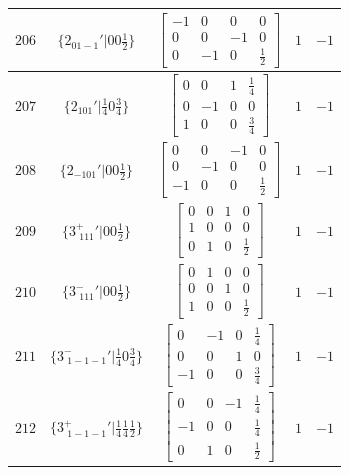 \documentclass[fleqn,8pt]{jsarticle}
\begin{document}
\begin{longtable}{ccccc}
$ 206 $ & $ \{2{}_{01-1}{}'|0 0 \frac{1}{2}\} $ & $ \begin{bmatrix} -1 & 0 & 0 & 0 \\ 0 & 0 & -1 & 0 \\ 0 & -1 & 0 & \frac{1}{2} \end{bmatrix} $ & $ 1 $ & $ -1 $ \\ \hline
$ 207 $ & $ \{2{}_{101}{}'|\frac{1}{4} 0 \frac{3}{4}\} $ & $ \begin{bmatrix} 0 & 0 & 1 & \frac{1}{4} \\ 0 & -1 & 0 & 0 \\ 1 & 0 & 0 & \frac{3}{4} \end{bmatrix} $ & $ 1 $ & $ -1 $ \\ \hline
$ 208 $ & $ \{2{}_{-101}{}'|0 0 \frac{1}{2}\} $ & $ \begin{bmatrix} 0 & 0 & -1 & 0 \\ 0 & -1 & 0 & 0 \\ -1 & 0 & 0 & \frac{1}{2} \end{bmatrix} $ & $ 1 $ & $ -1 $ \\ \hline
$ 209 $ & $ \{3^{+}_{\,\,111}{}'|0 0 \frac{1}{2}\} $ & $ \begin{bmatrix} 0 & 0 & 1 & 0 \\ 1 & 0 & 0 & 0 \\ 0 & 1 & 0 & \frac{1}{2} \end{bmatrix} $ & $ 1 $ & $ -1 $ \\ \hline
$ 210 $ & $ \{3^{-}_{\,\,111}{}'|0 0 \frac{1}{2}\} $ & $ \begin{bmatrix} 0 & 1 & 0 & 0 \\ 0 & 0 & 1 & 0 \\ 1 & 0 & 0 & \frac{1}{2} \end{bmatrix} $ & $ 1 $ & $ -1 $ \\ \hline
$ 211 $ & $ \{3^{-}_{\,\,1-1-1}{}'|\frac{1}{4} 0 \frac{3}{4}\} $ & $ \begin{bmatrix} 0 & -1 & 0 & \frac{1}{4} \\ 0 & 0 & 1 & 0 \\ -1 & 0 & 0 & \frac{3}{4} \end{bmatrix} $ & $ 1 $ & $ -1 $ \\ \hline
$ 212 $ & $ \{3^{+}_{\,\,1-1-1}{}'|\frac{1}{4} \frac{1}{4} \frac{1}{2}\} $ & $ \begin{bmatrix} 0 & 0 & -1 & \frac{1}{4} \\ -1 & 0 & 0 & \frac{1}{4} \\ 0 & 1 & 0 & \frac{1}{2} \end{bmatrix} $ & $ 1 $ & $ -1 $ \\ \hline

\end{longtable}
\end{document}
